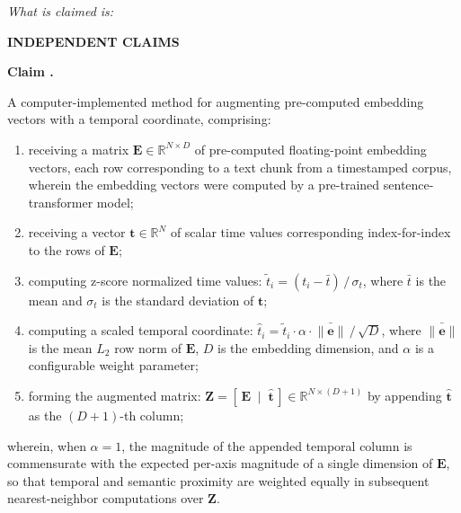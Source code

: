 \documentclass[12pt,letterpaper]{article}
\newcounter{claimcounter}
\newenvironment{claim}{%
  \refstepcounter{claimcounter}%
  \noindent\textbf{Claim \theclaimcounter.}\ %
}{%
  \par\medskip%
}
\begin{document}
\noindent\textit{What is claimed is:}

\bigskip


\noindent\textbf{INDEPENDENT CLAIMS}

\bigskip

\begin{claim}
A computer-implemented method for augmenting pre-computed embedding vectors
with a temporal coordinate, comprising:

\begin{enumerate}[label=(\alph*), noitemsep]
  \item receiving a matrix $\mathbf{E} \in \mathbb{R}^{N \times D}$ of
    pre-computed floating-point embedding vectors, each row corresponding to
    a text chunk from a timestamped corpus, wherein the embedding vectors
    were computed by a pre-trained sentence-transformer model;

  \item receiving a vector $\mathbf{t} \in \mathbb{R}^N$ of scalar time
    values corresponding index-for-index to the rows of $\mathbf{E}$;

  \item computing z-score normalized time values:
    $\tilde{t}_i = (t_i - \bar{t})\,/\,\sigma_t$,
    where $\bar{t}$ is the mean and $\sigma_t$ is the standard deviation
    of $\mathbf{t}$;

  \item computing a scaled temporal coordinate:
    $\hat{t}_i = \tilde{t}_i \cdot \alpha \cdot \bar{\|\mathbf{e}\|}\,/\,\sqrt{D}$,
    where $\bar{\|\mathbf{e}\|}$ is the mean $L_2$ row norm of $\mathbf{E}$,
    $D$ is the embedding dimension, and $\alpha$ is a configurable weight
    parameter;

  \item forming the augmented matrix:
    $\mathbf{Z} = [\,\mathbf{E}\;\mid\;\hat{\mathbf{t}}\,]
    \in \mathbb{R}^{N \times (D+1)}$
    by appending $\hat{\mathbf{t}}$ as the $(D+1)$-th column;
\end{enumerate}

wherein, when $\alpha = 1$, the magnitude of the appended temporal column is
commensurate with the expected per-axis magnitude of a single dimension of
$\mathbf{E}$, so that temporal and semantic proximity are weighted equally in
subsequent nearest-neighbor computations over $\mathbf{Z}$.
\end{claim}
\end{document}
